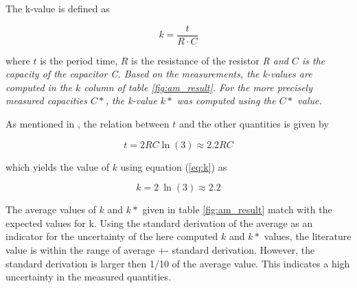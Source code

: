 \documentclass[journal]{IEEEtran}
\begin{document}
The k-value is defined as

\begin{equation}
	k = \frac{t}{R \cdot C}
	\label{eq:k}
\end{equation}

where $t$ is the period time, $R$ is the resistance of the resistor
\em{R} and $C$ is the capacity of the capacitor \em{C}. Based on the
measurements, the k-values are computed in the $k$
column of table \ref{fig:am_result}. For the more precisely measured
capacities $C*$, the k-value $k*$ was computed using the $C*$ value.

As mentioned in \cite{book_dg}, the relation between $t$ and the other
quantities is given by

\begin{equation}
	t = 2RC\ln(3) \approx 2.2RC
\end{equation}

which yields the value of $k$ using equation (\ref{eq:k}) as

\begin{equation}
	k = 2~\ln(3) \approx 2.2
	\label{eq:k_lit}
\end{equation}

The average values of $k$ and $k*$ given in table \ref{fig:am_result} match with the expected values for k. Using the standard derivation of the
average as an indicator for the uncertainty of the here computed $k$ and $k*$
values, the literature value is within the range of average +- standard derivation.
However, the standard derivation is larger then 1/10 of the average value.
 This indicates a high uncertainty in the measured quantities.
\end{document}
